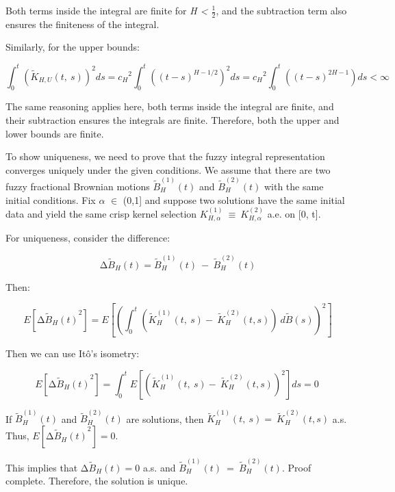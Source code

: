 \documentclass[12pt,a4paper]{report}
\numberwithin{equation}{section}
\begin{document}
Both terms inside the integral are finite for \emph{H \textless{} $\frac{1}{2}$},
and the subtraction term also ensures the finiteness of the integral.

Similarly, for the upper bounds:

\[\int_{0}^{t}\left( {\widetilde{K}}_{H,U}(t,\ s) \right)^{2}ds = {c_{H}}^{2}\int_{0}^{t}{\left( {(t - s)}^{H - 1/2}  \right)^{2}ds = {c_{H}}^{2}\int_{0}^{t}{\left( {(t - s)}^{2H - 1} \right)ds < \infty}}\]

The same reasoning applies here, both terms inside the integral are
finite, and their subtraction ensures the integrals are finite.
Therefore, both the upper and lower bounds are finite.

To show uniqueness, we need to prove that the fuzzy integral
representation converges uniquely under the given conditions. We assume
that there are two fuzzy fractional Brownian motions
\({\widetilde{B}}_{H}^{(1)}(t)\) and \({\widetilde{B}}_{H}^{(2)}(t)\)
with the same initial conditions. Fix $\alpha$ $\in$ (0,1{]} and suppose two
solutions have the same initial data and yield the same crisp kernel
selection \(K_{H,\alpha}^{(1)}\  \equiv \ K_{H,\alpha}^{(2)}\) a.e. on
{[}0, t{]}.

For uniqueness, consider the difference:

\[{\mathrm{\Delta}\widetilde{B}}_{H}(t) = {\widetilde{B}}_{H}^{(1)}(t)\  - \ {\widetilde{B}}_{H}^{(2)}(t)\]

Then:

\[E\left\lbrack {{\mathrm{\Delta}\widetilde{B}}_{H}(t)}^{2} \right\rbrack = E\left\lbrack \left( \int_{0}^{t}{\left( {\widetilde{K}}_{H}^{(1)}(t,\ s) - \ {\widetilde{K}}_{H}^{(2)}(t,s) \right)\ d\widetilde{B}(s)} \right)^{2} \right\rbrack\]

Then we can use Itô's isometry:

\[E\left\lbrack {{\mathrm{\Delta}\widetilde{B}}_{H}(t)}^{2} \right\rbrack = \int_{0}^{t}{E\left\lbrack \left( {\widetilde{K}}_{H}^{(1)}(t,\ s) - \ {\widetilde{K}}_{H}^{(2)}(t,s) \right)^{2} \right\rbrack ds = 0\ }\]

If \({\widetilde{B}}_{H}^{(1)}(t)\) and \({\widetilde{B}}_{H}^{(2)}(t)\)
are solutions, then
\({\widetilde{K}}_{H}^{(1)}(t,\ s) = \ {\widetilde{K}}_{H}^{(2)}(t,s)\)
a.s. Thus,
\(E\left\lbrack {{\mathrm{\Delta}\widetilde{B}}_{H}(t)}^{2} \right\rbrack = 0.\ \)

This implies that \({\mathrm{\Delta}\widetilde{B}}_{H}(t) = 0\) a.s. and
\({\widetilde{B}}_{H}^{(1)}(t)\  = \ {\widetilde{B}}_{H}^{(2)}(t)\).
Proof complete. Therefore, the solution is unique.
\end{document}
